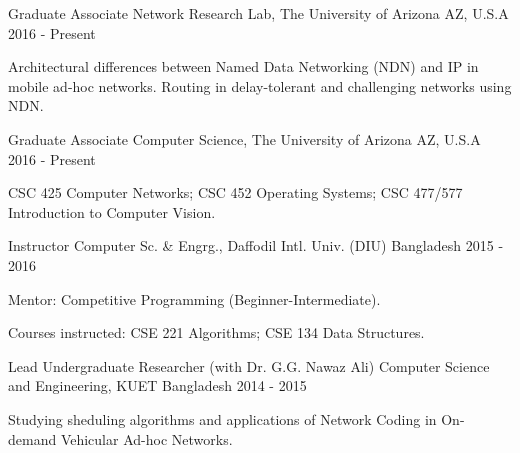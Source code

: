 

\begin{cventries}

  \cventry
    {Graduate Associate} %
    {Network Research Lab, The University of Arizona} %
    {AZ, U.S.A} %
    {2016 - Present} %
    {
      \begin{cvitems} %
        \item {Architectural differences between Named Data Networking (NDN) and IP in mobile ad-hoc networks. Routing in delay-tolerant and challenging networks using NDN.}
      \end{cvitems}
    }
    {}

  \cventry
    {Graduate Associate} %
    {Computer Science, The University of Arizona} %
    {AZ, U.S.A} %
    {2016 - Present} %
    {
      \begin{cvitems} %
        \item {CSC 425 Computer Networks; CSC 452 Operating Systems; CSC 477/577 Introduction to Computer Vision.}
      \end{cvitems}
    }
    {}

  \cventry
    {Instructor} %
    {Computer Sc. \& Engrg., Daffodil Intl. Univ. (DIU)} %
    {Bangladesh} %
    {2015 - 2016} %
    {
      \begin{cvitems} %
        \item {Mentor: Competitive Programming (Beginner-Intermediate).}
        \item {Courses instructed: CSE 221 Algorithms; CSE 134 Data Structures.}
      \end{cvitems}
    }
    {}

  \cventry
    {Lead Undergraduate Researcher (with Dr. G.G. Nawaz Ali)} %
    {Computer Science and Engineering, KUET} %
    {Bangladesh} %
    {2014 - 2015} %
    {
      \begin{cvitems} %
        \item {Studying sheduling algorithms and applications of Network Coding in On-demand Vehicular Ad-hoc Networks.}
      \end{cvitems}
    }
    {}


\end{cventries}
